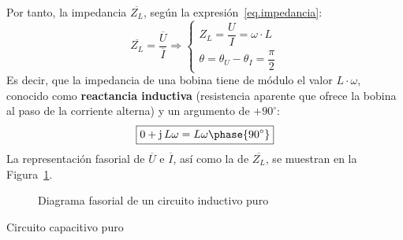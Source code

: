 \documentclass[11pt]{book} %
\makeatletter
\numberwithin{dummy}{section}
\theoremstyle{ocrenumbox}
\theoremstyle{blacknumex}
\theoremstyle{blacknumbox}
\theoremstyle{ocrenum}
\renewcommand{\subsection}{\@startsection {subsection}{2}{\z@}
{-3ex \@plus -0.1ex \@minus -.4ex}
{0.5ex \@plus.2ex }
{\normalfont\sffamily\bfseries}}
\makeatother
\begin{document}
	Por tanto, la impedancia $\overline{Z_L}$, según la expresión~\eqref{eq.impedancia}:
	\begin{equation*}
		\overline{Z_L}=\dfrac{\overline{U}}{\overline{I}}\Rightarrow
		\begin{cases}
			Z_L=\dfrac{U}{I}=\omega\cdot L\\
			\theta=\theta_U-\theta_I=\dfrac{\pi}{2}
		\end{cases}
	\end{equation*}
	Es decir, que la impedancia de una bobina tiene de módulo el valor $L\cdot\omega$, conocido como \textbf{reactancia inductiva} (resistencia aparente que ofrece la bobina al paso de la corriente alterna) y un argumento de $+90^\circ$:
	\begin{equation}
		\boxed{0+\mathrm{j}\,L\omega=L\omega\phase{90^\circ}}
	\end{equation}
	La representación fasorial de $\overline{U}$ e $\overline{I}$, así como la de $\overline{Z_L}$, se muestran en la Figura~\ref{fig.fasorInductancia}. 
	\begin{figure}[htbp]
		\centering
		\hfil
		\caption{Diagrama fasorial de un circuito inductivo puro}
		\label{fig.fasorInductancia}
	\end{figure}
	
	\subsection{Circuito capacitivo puro}\label{sec.C-puro}
	
\end{document}
